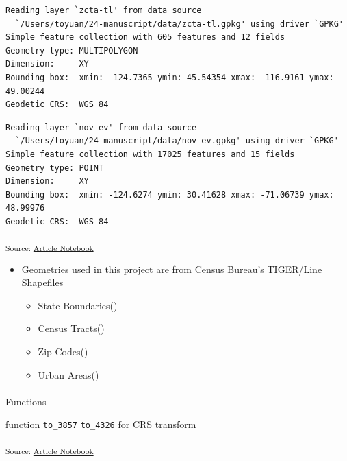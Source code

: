 \documentclass[
  letterpaper,
  DIV=11,
  numbers=noendperiod]{scrartcl}
\makeatletter
\let\oldparagraph\paragraph
\renewcommand{\paragraph}{
    \@ifstar
      \xxxParagraphStar
      \xxxParagraphNoStar
  }
\newcommand{\xxxParagraphStar}[1]{\oldparagraph*{#1}\mbox{}}
\newcommand{\xxxParagraphNoStar}[1]{\oldparagraph{#1}\mbox{}}
\providecommand{\tightlist}{%
  \setlength{\itemsep}{0pt}\setlength{\parskip}{0pt}}\usepackage{longtable,booktabs,array}
\makeatother
\begin{document}
\begin{verbatim}
Reading layer `zcta-tl' from data source 
  `/Users/toyuan/24-manuscript/data/zcta-tl.gpkg' using driver `GPKG'
Simple feature collection with 605 features and 12 fields
Geometry type: MULTIPOLYGON
Dimension:     XY
Bounding box:  xmin: -124.7365 ymin: 45.54354 xmax: -116.9161 ymax: 49.00244
Geodetic CRS:  WGS 84
\end{verbatim}

\begin{verbatim}
Reading layer `nov-ev' from data source 
  `/Users/toyuan/24-manuscript/data/nov-ev.gpkg' using driver `GPKG'
Simple feature collection with 17025 features and 15 fields
Geometry type: POINT
Dimension:     XY
Bounding box:  xmin: -124.6274 ymin: 30.41628 xmax: -71.06739 ymax: 48.99976
Geodetic CRS:  WGS 84
\end{verbatim}

\textsubscript{Source:
\href{https://h-christy.github.io/24-manuscript/index.qmd.html}{Article
Notebook}}

\begin{itemize}
\tightlist
\item
  Geometries used in this project are from Census Bureau's TIGER/Line
  Shapefiles

  \begin{itemize}
  \tightlist
  \item
    State Boundaries()
  \item
    Census Tracts()
  \item
    Zip Codes()
  \item
    Urban Areas()
  \end{itemize}
\end{itemize}

\paragraph{Functions}\label{functions}

function \texttt{to\_3857} \texttt{to\_4326} for CRS transform

\textsubscript{Source:
\href{https://h-christy.github.io/24-manuscript/index.qmd.html}{Article
Notebook}}
\end{document}
